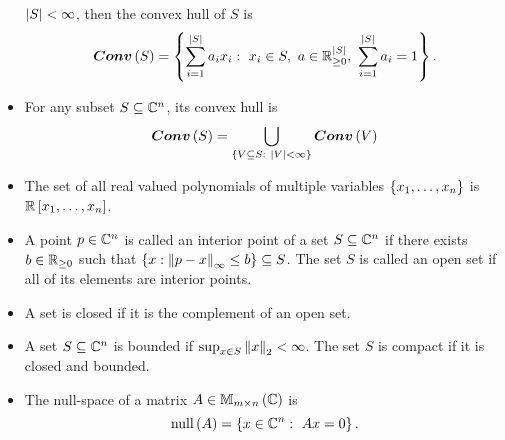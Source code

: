 \begin{itemize}
  $\left|S\right|<\infty$, then the convex hull of $S$ is
%
  \[
\bm{Conv}\left(S\right)=\left\{\sum_{i=1}^{\left|S\right|}a_ix_i:~x_i\in
  S,~a\in\mathbb{R}^{\left|S\right|}_{\geq 0},~\sum_{i=1}^{\left|S\right|}a_i=1\right\}.
  \]
\item For any subset $S\subseteq\mathbb{C}^n$, its convex hull is
%
  \[
\bm{Conv}\left(S\right)=\bigcup_{\left\{V\subseteq S:~\left|V\right|<\infty\right\}}\bm{Conv}\left(V\right)
  \]
\item The set of all real valued polynomials of multiple variables
  $\left\{x_1,\ldots,x_n\right\}$ is $\mathbb{R}\left[x_1,\ldots,x_n\right]$.
\item A point $p\in\mathbb{C}^n$ is called an interior point of a set
  $S\subseteq\mathbb{C}^n$ if there exists $b\in\mathbb{R}_{\geq 0}$ such
  that $\left\{x:\left\|p-x\right\|_{\infty}\leq b\right\}\subseteq S$.  The set $S$ is called
  an open set if all of its elements are interior points.
\item A set is closed if it is the complement of an open set.
\item A set $S\subseteq\mathbb{C}^n$ is bounded if $\sup_{x\in
  S}\left\|x\right\|_2< \infty$.  The set $S$ is compact if it is closed and
  bounded.
\item The null-space of a matrix $A\in\mathbb{M}_{m\times n}\left(\mathbb{C}\right)$ is
  \[
\operatorname{null}\left(A\right)=\left\{x\in\mathbb{C}^n:~Ax=0\right\}.
  \]
\end{itemize}


